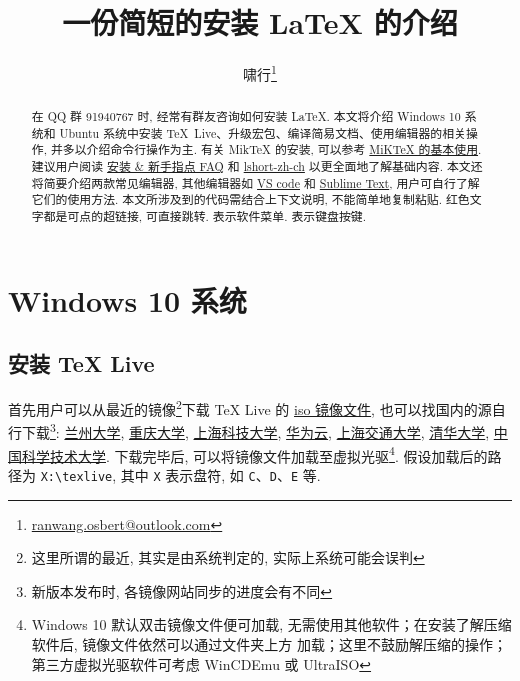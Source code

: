 \documentclass{ctexrep}
\title{\bfseries 一份简短的安装 \LaTeX{} 的介绍}
\author{啸行\thanks{\url{ranwang.osbert@outlook.com}}}
\begin{document}
  
\maketitle

\begin{abstract}
在 QQ 群 91940767 时, 经常有群友咨询如何安装 \LaTeX.
本文将介绍 Windows 10 系统和 Ubuntu 系统中安装 \TeX{}~Live、升级宏包、编译简易文档、使用编辑器的相关操作, 并多以介绍命令行操作为主.
有关 Mik\TeX{} 的安装, 可以参考 \href{https://camuseblog.top/2019-03-02-/MiKTeX/}{MiK\TeX{} 的基本使用}.
建议用户阅读 \href{http://www.latexstudio.net/archives/11469.html}{\LaTeXe{} 安装 \& 新手指点 FAQ} 和 \href{http://mirrors.ctan.org/info/lshort/chinese/lshort-zh-cn.pdf}{lshort-zh-ch} 以更全面地了解基础内容.
本文还将简要介绍两款常见编辑器, 其他编辑器如 \href{https://github.com/EthanDeng/vscode-latex}{VS code} 和 \href{https://github.com/EthanDeng/sublime-text-latex}{Sublime Text}, 用户可自行了解它们的使用方法.
本文所涉及到的代码需结合上下文说明, 不能简单地复制粘贴.
红色文字都是可点的超链接, 可直接跳转.
 表示软件菜单.
 表示键盘按键.
\end{abstract}

\tableofcontents

\chapter{Windows 10 系统}

\section{安装 \TeX{} Live}
首先用户可以从最近的镜像\footnote{这里所谓的最近, 其实是由系统判定的, 实际上系统可能会误判}下载 \TeX{} Live 的 \href{http://mirrors.ctan.org/systems/texlive/Images/texlive.iso}{iso 镜像文件},
也可以找国内的源自行下载\footnote{新版本发布时, 各镜像网站同步的进度会有不同}: \href{http://mirror.lzu.edu.cn/CTAN/systems/texlive/Images/texlive.iso}{兰州大学},
\href{http://mirrors.cqu.edu.cn/CTAN/systems/texlive/Images/texlive.iso}{重庆大学},
\href{http://mirrors-wan.geekpie.club/CTAN/systems/texlive/Images/texlive.iso}{上海科技大学},
\href{http://mirrors.huaweicloud.com/repository/toolkit/CTAN/systems/texlive/Images/texlive.iso}{华为云},
\href{http://mirrors.sjtug.sjtu.edu.cn/ctan/systems/texlive/Images/texlive.iso}{上海交通大学},
\href{http://mirrors.tuna.tsinghua.edu.cn/CTAN/systems/texlive/Images/texlive.iso}{清华大学},
\href{http://mirrors.ustc.edu.cn/CTAN/systems/texlive/Images/texlive.iso}{中国科学技术大学}.
下载完毕后, 可以将镜像文件加载至虚拟光驱\footnote{Windows 10 默认双击镜像文件便可加载, 无需使用其他软件；在安装了解压缩软件后, 镜像文件依然可以通过文件夹上方  加载；这里不鼓励解压缩的操作；第三方虚拟光驱软件可考虑 WinCDEmu 或 UltraISO}. 
假设加载后的路径为 \texttt{X:\textbackslash texlive}, 其中 \texttt{X} 表示盘符, 如 \texttt{C}、\texttt{D}、\texttt{E} 等. 
\end{document}
